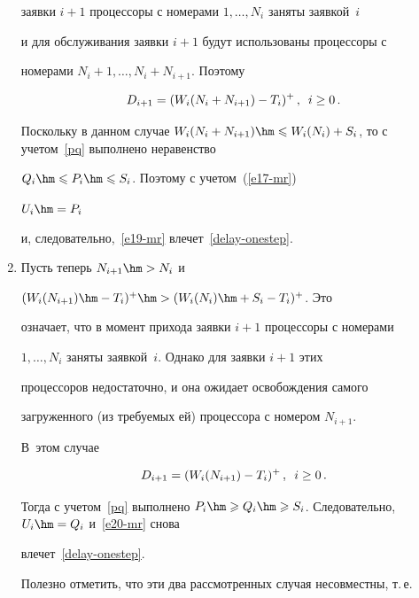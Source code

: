\begin{multicols}{2}
\begin{enumerate}[1.]
заявки $i+1$ процессоры с номерами $1,\ldots,N_{i}$ заняты заявкой~$i$ 

и для обслуживания заявки $i+1$ будут использованы процессоры с

номерами $N_{i}+1,\ldots, N_{i}+N_{i+1}$.  Поэтому

\begin{equation}

D_{i+1}=(W_{i}(N_{i}+N_{i+1})-T_{i})^{+}\,,\enskip i\ge 0\,.

\label{e19-mr}

\end{equation}

Поскольку в данном  случае $W_{i}(N_{i}+N_{i+1})\hm\leqslant

W_{i}(N_{i})+S_{i}$, то с учетом~\eqref{pq} выполнено неравенство

$Q_{i}\hm\leqslant P_{i}\hm\leqslant S_{i}$. Поэтому с учетом~(\ref{e17-mr})

$U_{i}\hm=P_{i}$

и, следовательно,~\eqref{e19-mr} влечет~\eqref{delay-onestep}.

\item

Пусть теперь  $N_{i+1}\hm>N_{i}$ и

$(W_{i}(N_{i+1})\hm-T_{i})^{+}\hm>(W_{i}(N_{i})\hm+S_{i}-T_{i})^{+}$. Это

означает, что в момент прихода заявки $i+1$ процессоры с номерами

$1,\ldots,N_{i}$ заняты заявкой~$i$. Однако   для заявки $i+1$ этих

процессоров недостаточно, и она ожидает  освобождения самого

загруженного (из требуемых ей) процессора с номером $N_{i+1}$. 

В~этом случае

\begin{equation}

D_{i+1}=(W_{i}(N_{i+1})-T_{i})^{+}\,,\enskip i\ge 0\,.

\label{e20-mr}

\end{equation}

Тогда с учетом~\eqref{pq} выполнено $P_{i}\hm\geqslant Q_{i}\hm\geqslant

S_{i}$. Следовательно, $U_{i}\hm=Q_{i}$ и~\eqref{e20-mr} снова

влечет~\eqref{delay-onestep}.



Полезно отметить, что эти два рассмотренных случая несовместны, т.\,е.\


\end{enumerate}
\end{multicols}
